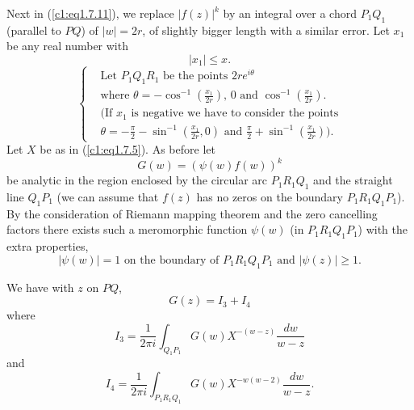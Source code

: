 \begin{step}\label{c1:step2}
Next in (\ref{c1:eq1.7.11}), we replace $|f(z)|^k$ by an integral over a chord $P_1Q_1$ (parallel to $PQ$) of $|w| = 2r$, of slightly bigger length with a similar error. Let $x_1$ be any real number with
\begin{equation*}
|x_1| \leq x .\tag{1.7.12}\label{c1:eq1.7.12}
\end{equation*}
\begin{equation*}
\begin{cases}
& \text{Let $P_1 Q_1 R_1$ be the points $2re^{i\theta}$}\\
& \text{where $\theta = - \cos^{-1} \left(\frac{x_1}{2r} \right)$, $0$ and $\cos^{-1} \left( \frac{x_1}{2r} \right)$.} \\
& \text{(If $x_1$ is negative we have to consider the points} \\
& \text{$\theta = - \frac{\pi}{2} - \sin^{-1} \left( \frac{x_1}{2r}, 0\right)$ and $\frac{\pi}{2} + \sin^{-1} \left(\frac{x_1}{2r} \right)$).}
\end{cases}
\tag{1.7.13}\label{c1:eq1.7.13}
\end{equation*}
Let $X$ be as in (\ref{c1:eq1.7.5}). As before let
\begin{equation*}
G(w) = (\psi(w) f(w))^k \tag{1.7.14}\label{c1:eq1.7.14}
\end{equation*}
be analytic in the region enclosed by the circular arc $P_1 R_1 Q_1$ and the straight line $Q_1 P_1$ (we can assume that $f(z)$ has no zeros on the boundary $P_1 R_1 Q_1 P_1$). By the consideration of Riemann mapping theorem and the zero cancelling factors there exists such a meromorphic function $\psi(w)$ (in $P_1 R_1 Q_1 P_1$) with the extra properties,
\begin{equation*}
  |\psi(w)| =1 \text{ on the boundary of } P_1 R_1 Q_1 P_1 \text{ and } |\psi (z)| \geq 1.  \tag{1.7.15}\label{c1:eq1.7.15}
\end{equation*}
\end{step}

\begin{lem}\label{c1:lem5d}
We have with $z$ on $PQ$,
$$
G(z) = I_3 + I_4
$$
where
\begin{equation*}
I_3 = \frac{1}{2 \pi i} \int_{Q_1P_1} G(w) X^{-(w-z)} \frac{dw}{w-z} \tag{1.7.16}\label{c1:eq1.7.16}
\end{equation*}
and\pageoriginale
\begin{equation*}
I_4  = \frac{1}{2\pi i} \int_{P_1 R_1 Q_1} G(w)  X^{-w(w-2)} \frac{dw}{w-z}. \tag{1.7.17}\label{c1:eq1.7.17}
\end{equation*}
\end{lem}

